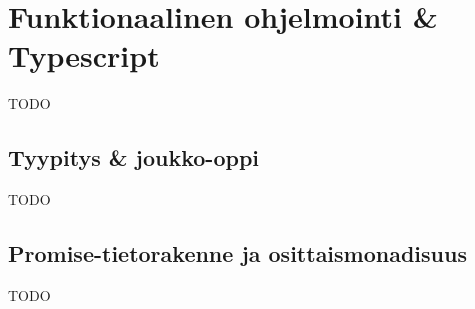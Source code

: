 \section{Funktionaalinen ohjelmointi \& Typescript}

TODO






\subsection{Tyypitys \& joukko-oppi}

TODO





\subsection{Promise-tietorakenne ja osittaismonadisuus}

TODO



